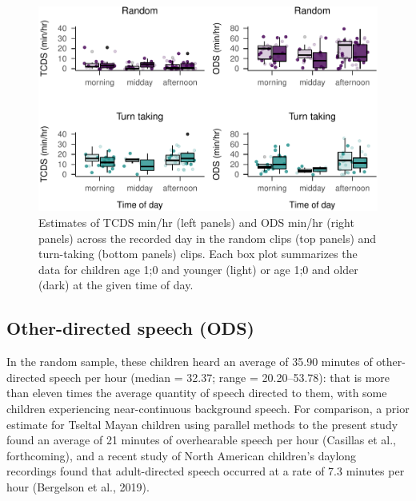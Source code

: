 \documentclass[,man,floatsintext]{apa6}
\begin{document}
\begin{figure}
\centering
\includegraphics{Yeli-CLE_files/figure-latex/fig4-1.pdf}
\caption{\label{fig:fig4}Estimates of TCDS min/hr (left panels) and ODS
min/hr (right panels) across the recorded day in the random clips (top
panels) and turn-taking (bottom panels) clips. Each box plot summarizes
the data for children age 1;0 and younger (light) or age 1;0 and older
(dark) at the given time of day.}
\end{figure}

\subsection{Other-directed speech
(ODS)}\label{other-directed-speech-ods}

In the random sample, these children heard an average of 35.90 minutes
of other-directed speech per hour (median = 32.37; range =
20.20--53.78): that is more than eleven times the average quantity of
speech directed to them, with some children experiencing near-continuous
background speech. For comparison, a prior estimate for Tseltal Mayan
children using parallel methods to the present study found an average of
21 minutes of overhearable speech per hour (Casillas et al.,
forthcoming), and a recent study of North American children's daylong
recordings found that adult-directed speech occurred at a rate of 7.3
minutes per hour (Bergelson et al., 2019).
\end{document}
